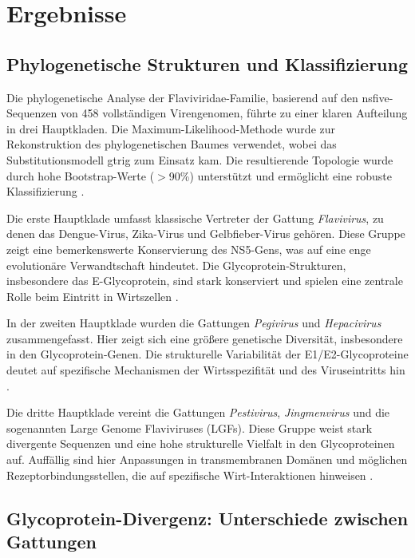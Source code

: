 \chapter{Ergebnisse} \label{chap:ergebnisse}

\section{Phylogenetische Strukturen und Klassifizierung} \label{sec:phylogenetische-strukturen}

Die phylogenetische Analyse der Flaviviridae-Familie, basierend auf den \gls{nsfive}-Sequenzen von 458 vollständigen Virengenomen, führte zu einer klaren Aufteilung in drei Hauptkladen. Die Maximum-Likelihood-Methode wurde zur Rekonstruktion des phylogenetischen Baumes verwendet, wobei das Substitutionsmodell \gls{gtrig} zum Einsatz kam. Die resultierende Topologie wurde durch hohe Bootstrap-Werte ($>$90\%) unterstützt und ermöglicht eine robuste Klassifizierung \autocite{mifsudMappingGlycoproteinStructure2024}.

Die erste Hauptklade umfasst klassische Vertreter der Gattung \textit{Flavivirus}, zu denen das Dengue-Virus, Zika-Virus und Gelbfieber-Virus gehören. Diese Gruppe zeigt eine bemerkenswerte Konservierung des NS5-Gens, was auf eine enge evolutionäre Verwandtschaft hindeutet. Die Glycoprotein-Strukturen, insbesondere das E-Glycoprotein, sind stark konserviert und spielen eine zentrale Rolle beim Eintritt in Wirtszellen \autocite{Rey1995}.

In der zweiten Hauptklade wurden die Gattungen \textit{Pegivirus} und \textit{Hepacivirus} zusammengefasst. Hier zeigt sich eine größere genetische Diversität, insbesondere in den Glycoprotein-Genen. Die strukturelle Variabilität der E1/E2-Glycoproteine deutet auf spezifische Mechanismen der Wirtsspezifität und des Viruseintritts hin \autocite{Vieyres2013}.

Die dritte Hauptklade vereint die Gattungen \textit{Pestivirus}, \textit{Jingmenvirus} und die sogenannten Large Genome Flaviviruses (LGFs). Diese Gruppe weist stark divergente Sequenzen und eine hohe strukturelle Vielfalt in den Glycoproteinen auf. Auffällig sind hier Anpassungen in transmembranen Domänen und möglichen Rezeptorbindungsstellen, die auf spezifische Wirt-Interaktionen hinweisen \autocite{Tautz2015}.

\section{Glycoprotein-Divergenz: Unterschiede zwischen Gattungen} \label{sec:glycoprotein-divergenz}

